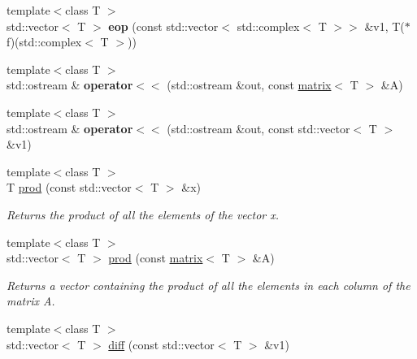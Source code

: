 \begin{DoxyCompactItemize}
\item 
\hypertarget{namespacekeycpp_a7f22b23749bd8423cf52448a34280ba4}{{\footnotesize template$<$class T $>$ }\\std\-::vector$<$ T $>$ {\bfseries eop} (const std\-::vector$<$ std\-::complex$<$ T $>$$>$ \&v1, T($\ast$f)(std\-::complex$<$ T $>$))}\label{namespacekeycpp_a7f22b23749bd8423cf52448a34280ba4}

\item 
\hypertarget{namespacekeycpp_a55e8bada51586c0561e1b32ca1ab5f2a}{{\footnotesize template$<$class T $>$ }\\std\-::ostream \& {\bfseries operator$<$$<$} (std\-::ostream \&out, const \hyperlink{classkeycpp_1_1matrix}{matrix}$<$ T $>$ \&A)}\label{namespacekeycpp_a55e8bada51586c0561e1b32ca1ab5f2a}

\item 
\hypertarget{namespacekeycpp_a300d8f6e8992c7b33156492d884bd621}{{\footnotesize template$<$class T $>$ }\\std\-::ostream \& {\bfseries operator$<$$<$} (std\-::ostream \&out, const std\-::vector$<$ T $>$ \&v1)}\label{namespacekeycpp_a300d8f6e8992c7b33156492d884bd621}

\item 
\hypertarget{namespacekeycpp_a5823fd4b932039262a1eddb2f4f47299}{{\footnotesize template$<$class T $>$ }\\T \hyperlink{namespacekeycpp_a5823fd4b932039262a1eddb2f4f47299}{prod} (const std\-::vector$<$ T $>$ \&x)}\label{namespacekeycpp_a5823fd4b932039262a1eddb2f4f47299}

\begin{DoxyCompactList}\small\item\em Returns the product of all the elements of the vector x. \end{DoxyCompactList}\item 
\hypertarget{namespacekeycpp_a9ff26fd7007c28ea88b3ad7cdf90546c}{{\footnotesize template$<$class T $>$ }\\std\-::vector$<$ T $>$ \hyperlink{namespacekeycpp_a9ff26fd7007c28ea88b3ad7cdf90546c}{prod} (const \hyperlink{classkeycpp_1_1matrix}{matrix}$<$ T $>$ \&A)}\label{namespacekeycpp_a9ff26fd7007c28ea88b3ad7cdf90546c}

\begin{DoxyCompactList}\small\item\em Returns a vector containing the product of all the elements in each column of the matrix A. \end{DoxyCompactList}\item 
\hypertarget{namespacekeycpp_ae67644e3e1031773d6bfdb1ebb7d88e2}{{\footnotesize template$<$class T $>$ }\\std\-::vector$<$ T $>$ \hyperlink{namespacekeycpp_ae67644e3e1031773d6bfdb1ebb7d88e2}{diff} (const std\-::vector$<$ T $>$ \&v1)}\label{namespacekeycpp_ae67644e3e1031773d6bfdb1ebb7d88e2}


\end{DoxyCompactItemize}
